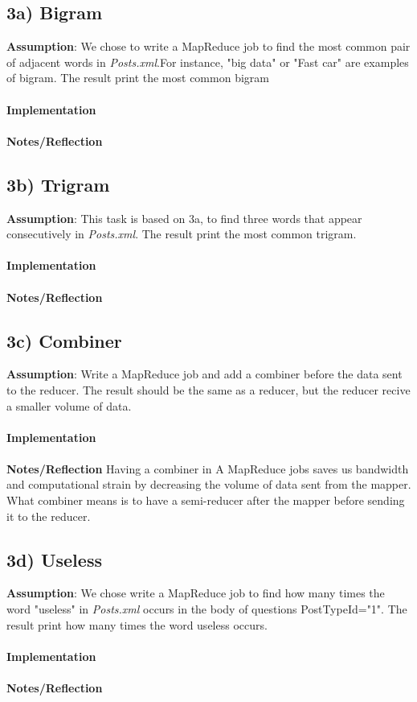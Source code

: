 \documentclass[fleqn,10pt]{wlscirep}
\begin{document}
\subsection*{3a) Bigram }
\textbf{Assumption}: We chose to write a MapReduce job to find the most common pair of adjacent words in \textit{Posts.xml}.For instance, "big data" or "Fast car" are examples of bigram. The result print the most common bigram   \\\\
\textbf{Implementation}  \\ \\
\textbf{Notes/Reflection}


\subsection*{3b) Trigram }
\textbf{Assumption}: This task is based on 3a, to find three words that appear consecutively in \textit{Posts.xml}. The result print the most common trigram.  \\ \\
\textbf{Implementation}  \\ \\
\textbf{Notes/Reflection}


\subsection*{3c) Combiner }
\textbf{Assumption}: Write a MapReduce job and add a combiner before  the data sent to the reducer. The result should be the same as a reducer, but the reducer recive a smaller volume of data.  \\ \\
\textbf{Implementation}  \\ \\
\textbf{Notes/Reflection} Having a combiner in A MapReduce jobs saves us bandwidth and computational strain by decreasing the volume of data sent from the mapper.  What combiner means is to have a semi-reducer after the mapper before sending it to the reducer. 


\subsection*{3d) Useless}
\textbf{Assumption}:  We chose write a MapReduce job  to find how many times the word "useless" in \textit{Posts.xml} occurs in the body of questions PostTypeId="1". The result print how many times the word useless occurs.  \\ \\
\textbf{Implementation}  \\ \\
\textbf{Notes/Reflection}
\end{document}
